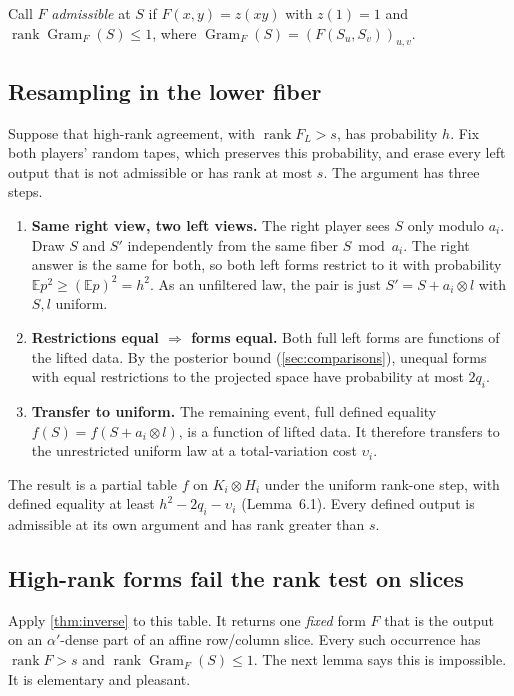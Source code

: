 \documentclass[11pt]{article}
\theoremstyle{definition}
\theoremstyle{remark}
\newcommand{\E}{\mathbb E}
\DeclareMathOperator{\rank}{rank}
\DeclareMathOperator{\Gram}{Gram}
\begin{document}
Call $F$ \emph{admissible} at $S$ if $F(x,y)=z(xy)$ with $z(1)=1$ and
$\rank\Gram_F(S)\le1$, where $\Gram_F(S)=(F(S_u,S_v))_{u,v}$.

\subsection{Resampling in the lower fiber}

Suppose that high-rank agreement, with $\rank F_L>s$, has probability $h$.
Fix both players' random tapes, which preserves this probability, and erase
every left output that is not admissible or has rank at most $s$. The
argument has three steps.
\begin{enumerate}
\item \textbf{Same right view, two left views.} The right player sees $S$ only
modulo $a_i$. Draw $S$ and $S'$ independently from the same fiber
$S\bmod a_i$. The right answer is the same for both, so both left forms
restrict to it with probability $\E p^2\ge(\E p)^2=h^2$. As an unfiltered
law, the pair is just $S'=S+a_i\otimes l$ with $S,l$ uniform.
\item \textbf{Restrictions equal $\Rightarrow$ forms equal.} Both full left
forms are functions of the lifted data. By the posterior bound
(\cref{sec:comparisons}), unequal forms with equal restrictions to the
projected space have probability at most $2q_i$.
\item \textbf{Transfer to uniform.} The remaining event, full defined equality
$f(S)=f(S+a_i\otimes l)$, is a function of lifted data. It therefore
transfers to the unrestricted uniform law at a total-variation cost
$\upsilon_i$.
\end{enumerate}
The result is a partial table $f$ on $K_i\otimes H_i$ under the uniform
rank-one step, with defined equality at least
$h^2-2q_i-\upsilon_i$ (Lemma~6.1). Every defined output is admissible at its
own argument and has rank greater than $s$.

\subsection{High-rank forms fail the rank test on slices}

Apply \cref{thm:inverse} to this table. It returns one \emph{fixed} form $F$
that is the output on an $\alpha'$-dense part of an affine row/column slice.
Every such occurrence has $\rank F>s$ and $\rank\Gram_F(S)\le1$. The next
lemma says this is impossible. It is elementary and pleasant.
\end{document}
